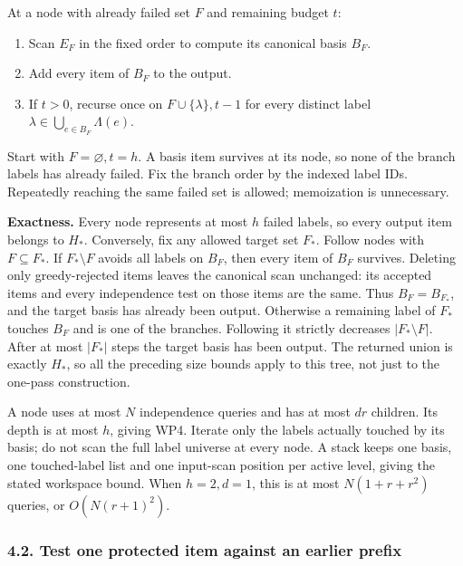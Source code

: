 At a node with already failed set \(F\) and remaining budget \(t\):

\begin{enumerate}
\def\labelenumi{\arabic{enumi}.}
\tightlist
\item
  Scan \(E_F\) in the fixed order to compute its canonical basis \(B_F\).
\item
  Add every item of \(B_F\) to the output.
\item
  If \(t>0\), recurse once on \(F\cup\{\lambda\},t-1\) for every distinct label \(\lambda\in\bigcup_{e\in B_F}\Lambda(e)\).
\end{enumerate}

Start with \(F=\varnothing,t=h\). A basis item survives at its node, so none of the branch labels has already failed. Fix the branch order by the indexed label IDs. Repeatedly reaching the same failed set is allowed; memoization is unnecessary.

\textbf{Exactness.} Every node represents at most \(h\) failed labels, so every output item belongs to \(H_*\). Conversely, fix any allowed target set \(F_*\). Follow nodes with \(F\subseteq F_*\). If \(F_*\setminus F\) avoids all labels on \(B_F\), then every item of \(B_F\) survives. Deleting only greedy-rejected items leaves the canonical scan unchanged: its accepted items and every independence test on those items are the same. Thus \(B_F=B_{F_*}\), and the target basis has already been output. Otherwise a remaining label of \(F_*\) touches \(B_F\) and is one of the branches. Following it strictly decreases \(|F_*\setminus F|\). After at most \(|F_*|\) steps the target basis has been output. The returned union is exactly \(H_*\), so all the preceding size bounds apply to this tree, not just to the one-pass construction.

A node uses at most \(N\) independence queries and has at most \(dr\) children. Its depth is at most \(h\), giving WP4. Iterate only the labels actually touched by its basis; do not scan the full label universe at every node. A stack keeps one basis, one touched-label list and one input-scan position per active level, giving the stated workspace bound. When \(h=2,d=1\), this is at most \(N(1+r+r^2)\) queries, or \(O(N(r+1)^2)\).

\hypertarget{af-eb38c0014f-test-one-protected-item-against-an-earlier-prefix}{%
\subsubsection{4.2. Test one protected item against an earlier prefix}\label{af-eb38c0014f-test-one-protected-item-against-an-earlier-prefix}}

